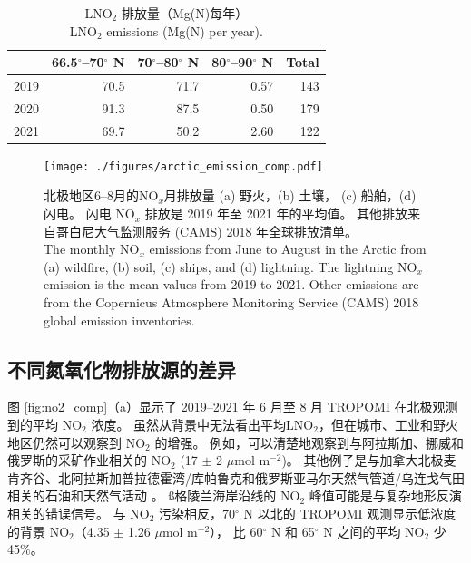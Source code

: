 \begin{table}
\centering
\caption{LNO$_2$ 排放量（Mg(N)每年）\\LNO$_2$ emissions (Mg(N) per year).}
\label{table:arctic_lno2_emission}
\begin{tabular}{rrrrr}
\hline
{} & 66.5$^{\circ}$--70$^{\circ}$ N & 70$^{\circ}$--80$^{\circ}$ N & 80$^{\circ}$--90$^{\circ}$ N &       Total \\
\hline
2019 &   70.5  & 71.7 &  0.57  &  143 \\
2020 &   91.3  & 87.5 &  0.50  &  179 \\
2021 &   69.7  & 50.2 &  2.60  &  122 \\
\hline
\end{tabular}
\end{table}

\begin{figure}[htbp]
\centering
\texttt{[image: ./figures/arctic\_emission\_comp.pdf]}
\caption{
北极地区6--8月的NO$_x$月排放量
(a) 野火，(b) 土壤，
(c) 船舶，(d) 闪电。
闪电 NO$_x$ 排放是 2019 年至 2021 年的平均值。
其他排放来自哥白尼大气监测服务 (CAMS) 2018 年全球排放清单。\\
The monthly NO$_x$ emissions from June to August in the Arctic from
(a) wildfire, (b) soil,
(c) ships, and (d) lightning.
The lightning NO$_x$ emission is the mean values from 2019 to 2021.
Other emissions are from the Copernicus Atmosphere Monitoring Service (CAMS) 2018 global emission inventories.
}
\label{fig:arctic_emission_comp}
\end{figure}


\subsection{不同氮氧化物排放源的差异}

图 \ref{fig:no2_comp}（a）显示了 2019--2021 年 6 月至 8 月 TROPOMI 在北极观测到的平均 NO$_2$ 浓度。
虽然从背景中无法看出平均LNO$_2$，但在城市、工业和野火地区仍然可以观察到 NO$_2$ 的增强。
例如，可以清楚地观察到与阿拉斯加、挪威和俄罗斯的采矿作业相关的 NO$_2$ (17 $\pm$ 2 $\mu$mol m$^{-2}$)。
其他例子是与加拿大北极麦肯齐谷、北阿拉斯加普拉德霍湾/库帕鲁克和俄罗斯亚马尔天然气管道/乌连戈气田相关的石油和天然气活动 \citep{VanDerA.2020}。
ß格陵兰海岸沿线的 NO$_2$ 峰值可能是与复杂地形反演相关的错误信号\citep{Hachmeister.2022}。
与 NO$_2$ 污染相反，70$^{\circ}$ N 以北的 TROPOMI 观测显示低浓度的背景 NO$_2$（4.35 $\pm$ 1.26 $\mu$mol m$^{-2}$），
比 60$^{\circ}$ N 和 65$^{\circ}$ N 之间的平均 NO$_2$ 少 45\%。


